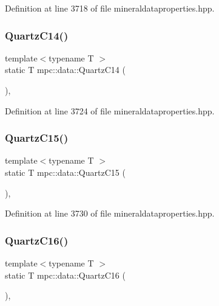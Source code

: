 Definition at line 3718 of file mineraldataproperties.\+hpp.

\mbox{\label{namespacempc_1_1data_afe8687899480b1c9ed8b3c94cd50d72a}} 
\subsubsection{\texorpdfstring{Quartz\+C14()}{QuartzC14()}}
{\footnotesize\ttfamily template$<$typename T $>$ \\
static T mpc\+::data\+::\+Quartz\+C14 (\begin{DoxyParamCaption}{ }\end{DoxyParamCaption})\hspace{0.3cm}{\ttfamily [inline]}, {\ttfamily [static]}}



Definition at line 3724 of file mineraldataproperties.\+hpp.

\mbox{\label{namespacempc_1_1data_a31080845468acf04e9476b7cb7e295a6}} 
\subsubsection{\texorpdfstring{Quartz\+C15()}{QuartzC15()}}
{\footnotesize\ttfamily template$<$typename T $>$ \\
static T mpc\+::data\+::\+Quartz\+C15 (\begin{DoxyParamCaption}{ }\end{DoxyParamCaption})\hspace{0.3cm}{\ttfamily [inline]}, {\ttfamily [static]}}



Definition at line 3730 of file mineraldataproperties.\+hpp.

\mbox{\label{namespacempc_1_1data_ab5360005bfa984f008538036e4ea9736}} 
\subsubsection{\texorpdfstring{Quartz\+C16()}{QuartzC16()}}
{\footnotesize\ttfamily template$<$typename T $>$ \\
static T mpc\+::data\+::\+Quartz\+C16 (\begin{DoxyParamCaption}{ }\end{DoxyParamCaption})\hspace{0.3cm}{\ttfamily [inline]}, {\ttfamily [static]}}



